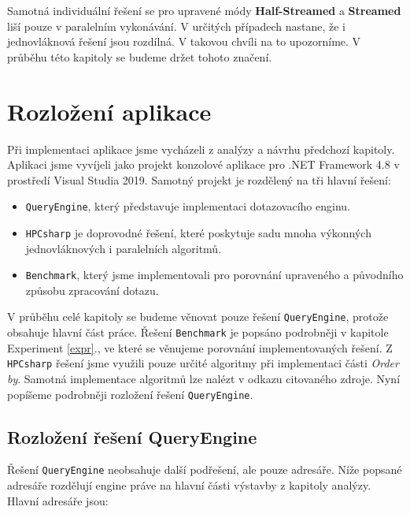 Samotná individuální řešení se pro upravené módy \textbf{Half-Streamed} a \textbf{Streamed} liší pouze v paralelním vykonávání.
V určitých případech nastane, že i jednovláknová řešení jsou rozdílná.
V takovou chvíli na to upozorníme.
V průběhu této kapitoly se budeme držet tohoto značení.


\section{Rozložení aplikace}

Při implementaci aplikace jsme vycházeli z analýzy a návrhu předchozí kapitoly.
Aplikaci jsme vyvíjeli jako projekt konzolové aplikace pro .NET Framework 4.8 v prostředí Visual Studia 2019.
Samotný projekt je rozdělený na tři hlavní řešení:

\begin{itemize}

\item \texttt{QueryEngine}, který představuje implementaci dotazovacího enginu.
\item \texttt{HPCsharp} \citep{hpcsharp} je doprovodné řešení, které poskytuje sadu mnoha výkonných jednovláknových i paralelních algoritmů.
\item \texttt{Benchmark}, který jsme implementovali pro porovnání upraveného a původního způsobu zpracování dotazu. 

\end{itemize}

V průběhu celé kapitoly se budeme věnovat pouze řešení \texttt{QueryEngine}, protože obsahuje hlavní část práce.
Řešení \texttt{Benchmark} je popsáno podrobněji v kapitole Experiment \ref{expr}., ve které se věnujeme porovnání implementovaných řešení.
Z \texttt{HPCsharp} řešení jsme využili pouze určité algoritmy při implementaci části \textit{Order by}.
Samotná implementace algoritmů lze nalézt v odkazu citovaného zdroje. 
Nyní popíšeme podrobněji rozložení řešení \texttt{QueryEngine}.

\subsection{Rozložení řešení QueryEngine}

Řešení \texttt{QueryEngine} neobsahuje další podřešení, ale pouze adresáře.
Níže popsané adresáře rozdělují engine práve na hlavní části výstavby z kapitoly analýzy.
Hlavní adresáře jsou:

